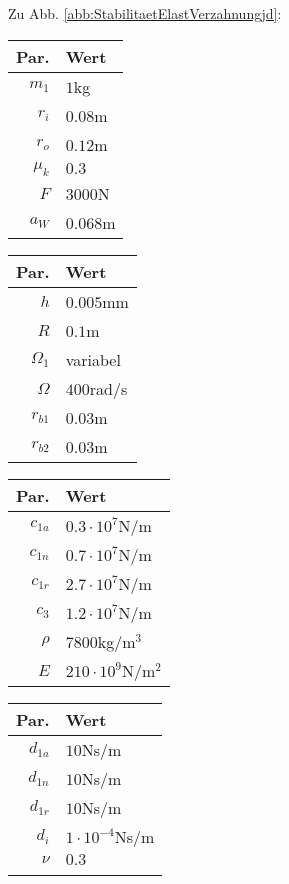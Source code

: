 Zu Abb. \ref{abb:StabilitaetElastVerzahnungjd}: 
\begin{center}
	\begin{tabular}{r|l}
		Par.&Wert\\\hline
		$m_1$&$1$kg\\
		$r_i$&$0.08$m\\
		$r_o$&$0.12$m\\
		$\mu_k$& $0.3$\\
		$F$&$3000$N\\
		$a_{W}$&$0.068$m\\
	\end{tabular}\hfill
	\begin{tabular}{r|l}
		Par.&Wert\\\hline
		$h$&$0.005$mm\\
		$R$&$0.1$m\\
		$\Omega_1$&variabel\\
		$\Omega$& $400$rad/s \\
		$r_{b1}$&$0.03$m\\
		$r_{b2}$&$0.03$m\\
	\end{tabular}\hfill
	\begin{tabular}{r|l}
		Par.&Wert\\\hline
		$c_{1a}$&$0.3\cdot10^{7}$N/m\\
		$c_{1n}$&$0.7\cdot10^{7}$N/m\\
		$c_{1r}$&$2.7\cdot10^{7}$N/m\\
		$c_{3}$&$1.2\cdot10^{7}$N/m\\
		$\rho$&$7800$kg/m$^3$\\
		$E$&$210\cdot10^9$N/m$^2$\\
	\end{tabular}\hfill
	\begin{tabular}{r|l}
		Par.&Wert\\\hline
		$d_{1a}$&$10$Ns/m\\
		$d_{1n}$&$10$Ns/m\\
		$d_{1r}$&$10$Ns/m\\
		$d_i$ &$1\cdot10^{-4}$Ns/m\\
		$\nu$&$0.3$\\
		&
	\end{tabular}
\end{center}

